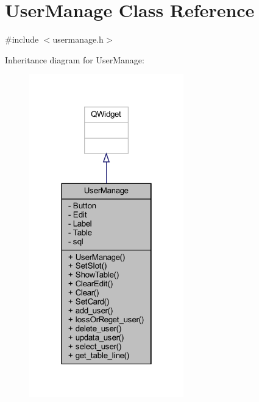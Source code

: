 \hypertarget{class_user_manage}{}\section{User\+Manage Class Reference}
\label{class_user_manage}


{\ttfamily \#include $<$usermanage.\+h$>$}



Inheritance diagram for User\+Manage\+:
\nopagebreak
\begin{figure}[H]
\begin{center}
\leavevmode
\includegraphics[width=190pt]{class_user_manage__inherit__graph}
\end{center}
\end{figure}


